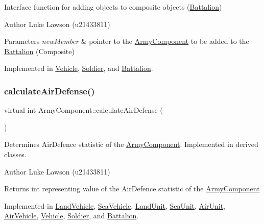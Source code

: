 Interface function for adding objects to composite objects (\mbox{\hyperlink{class_battalion}{Battalion}}) 

\begin{DoxyAuthor}{Author}
Luke Lawson (u21433811) 
\end{DoxyAuthor}

\begin{DoxyParams}{Parameters}
{\em new\+Member} & pointer to the \mbox{\hyperlink{class_army_component}{Army\+Component}} to be added to the \mbox{\hyperlink{class_battalion}{Battalion}} (Composite) \\
\hline
\end{DoxyParams}


Implemented in \mbox{\hyperlink{class_vehicle_ae704e3c6f06b96ab5deff0ab0ef510f5}{Vehicle}}, \mbox{\hyperlink{class_soldier_af158cf7ebb1fbf27d4b46c272de60803}{Soldier}}, and \mbox{\hyperlink{class_battalion_a5ddf1bec9075e00dc11e1020af3d5b67}{Battalion}}.

\mbox{\label{class_army_component_a9f6671dd8cd4037722f592f0fa86e3a2}} 
\subsubsection{\texorpdfstring{calculateAirDefense()}{calculateAirDefense()}}
{\footnotesize\ttfamily virtual int Army\+Component\+::calculate\+Air\+Defense (\begin{DoxyParamCaption}{ }\end{DoxyParamCaption})\hspace{0.3cm}{\ttfamily [pure virtual]}}



Determines Air\+Defence statistic of the \mbox{\hyperlink{class_army_component}{Army\+Component}}. Implemented in derived classes. 

\begin{DoxyAuthor}{Author}
Luke Lawson (u21433811) 
\end{DoxyAuthor}
\begin{DoxyReturn}{Returns}
int representing value of the Air\+Defence statistic of the \mbox{\hyperlink{class_army_component}{Army\+Component}} 
\end{DoxyReturn}


Implemented in \mbox{\hyperlink{class_land_vehicle_af5083b44d73c3597be9ab081d06bc7a6}{Land\+Vehicle}}, \mbox{\hyperlink{class_sea_vehicle_a694afec180b77cee3adf29674e0c3160}{Sea\+Vehicle}}, \mbox{\hyperlink{class_land_unit_acf9d648efacea20a028b2d9dcaca0d64}{Land\+Unit}}, \mbox{\hyperlink{class_sea_unit_ab05ac5cd7be62a139c16f36146c17b00}{Sea\+Unit}}, \mbox{\hyperlink{class_air_unit_a78796cdf870a76c072e89445a4c8ba15}{Air\+Unit}}, \mbox{\hyperlink{class_air_vehicle_ade9dabaec365370683599f3df95189c2}{Air\+Vehicle}}, \mbox{\hyperlink{class_vehicle_ae87cbec24f436b431fbed096024c41c9}{Vehicle}}, \mbox{\hyperlink{class_soldier_a3dc2d7a06621380c4561d330d5359dc2}{Soldier}}, and \mbox{\hyperlink{class_battalion_aa7e5340aa0d4547fcc7a4ecfd4fb31cb}{Battalion}}.

